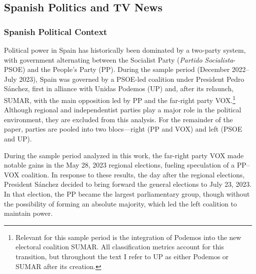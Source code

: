 \documentclass[12pt]{article}
\begin{document}
	
	
	
	
	
	\subsection{Spanish Politics and TV News}
	
	
	

	
	
	
	\subsubsection*{Spanish Political Context}
	

	

	
	
	Political power in Spain has historically been dominated by a two-party system, with government alternating between the Socialist Party (\textit{Partido Socialista}-PSOE) and the People’s Party (PP). During the sample period (December 2022–July 2023), Spain was governed by a PSOE-led coalition under President Pedro Sánchez, first in alliance with Unidas Podemos (UP) and, after its relaunch, SUMAR,  with the main opposition led by PP and the far-right party VOX.\footnote{Relevant for this sample period  is the integration of Podemos into the new electoral coalition SUMAR. All classification metrics account for this transition, but throughout the text I refer to UP as either Podemos or SUMAR after its creation.} Although regional and independentist parties play a major role in the political environment, they are excluded from this analysis. For the remainder of the paper, parties are pooled into two blocs—right (PP and VOX) and left (PSOE and UP).
	
	
	 During the sample period analyzed in this work, the far-right party VOX made notable gains in the May 28, 2023 regional elections, fueling speculation of a PP–VOX coalition. In response to these results, the day after the regional elections, President Sánchez decided to bring forward the general elections to July 23, 2023. In that election, the PP became the largest parliamentary group, though without the possibility of forming an absolute majority, which led  the left coalition to maintain power. 
	
\end{document}

